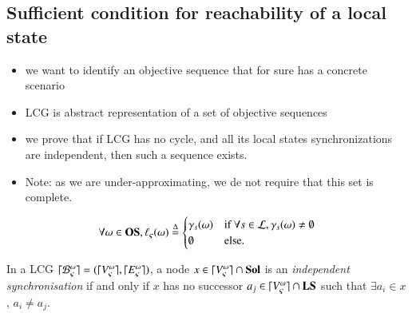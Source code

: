%
\begin{comment}
\noindent
For a given context $\ctx$, we note $a_i \in \ctx$ if and only if $a_i \in \PHget{\ctx}{a}$,
and for all $ps \in \powerset(\PHproc)$ or $ps \in \PHl$, $ps \subseteq \ctx \EQDEF \forall a_i \in ps, a_i \in \ctx$.
A sequence of actions $\delta$ is \emph{playable} in a context $\ctx$ if and only if 
$\exists s \subseteq \ctx, \delta \in \Sce(s)$.
We denote then: $\delta \in \Sce(\ctx)$,
and the play of $\delta$ in $\ctx$ is $\ctx \PHplay \delta = \ctx \Cap \ceil(\delta)$,
where $\ceil(\delta)$ is the set containing the last local state in the sequence $\delta$ (hitter or bounce) of every automaton mentioned in $\delta$.

\end{comment}


\subsection{Sufficient condition for reachability of a local state}
\label{ssec:ua}

\begin{itemize}
\item we want to identify an objective sequence that for sure has a concrete scenario
\item LCG is abstract representation of a set of objective sequences
\item we prove that if LCG has no cycle, and all its local states synchronizations are independent,
then such a sequence exists.
\item Note: as we are under-approximating, we de not require that this set is complete.
\end{itemize}

\begin{definition}[$\uconcr: \OS \rightarrow \powerset(\Sce)$]
\label{def:uconcr}
  \[
  \forall \omega \in \mathbf{OS},
  \ell_\varsigma(\omega) \stackrel{\Delta}=
  \begin{cases}
    \gamma_s(\omega) & \text{if } \forall s \in \mathcal{L}, \gamma_s(\omega)\neq\emptyset\\
    \emptyset & \text{else.}
  \end{cases}
  \]
\end{definition}

\begin{definition}
\label{def:coherent}
  In a LCG $\lceil \mathcal{B}_{\varsigma}^{\omega}\rceil = (\lceil V_\varsigma^\omega\rceil, \lceil E_\varsigma^\omega\rceil)$,
  a node $x \in \lceil V_\varsigma^\omega\rceil\cap\mathbf{Sol}$ is an \emph{independent synchronisation} if and only if
  $x$ has no successor $a_j \in \lceil V_\varsigma^\omega\rceil \cap \mathbf{LS}$ such that $\exists a_i \in x$, $a_i \neq a_j$.
\end{definition}


